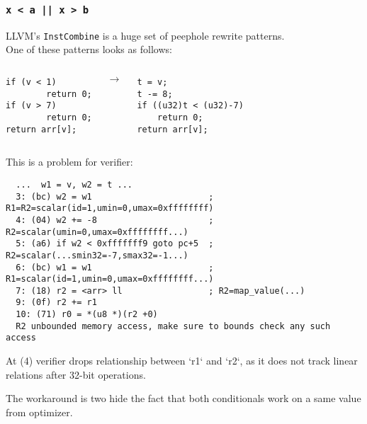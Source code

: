 \documentclass{beamer}
\newcommand{\code}[1]{\texttt{#1}}
\begin{document}
\begin{frame}
  \frametitle{\code{x < a || x > b}}

  LLVM's \code{InstCombine} is a huge set of peephole rewrite patterns. \\
  One of these patterns looks as follows:

  \vspace{0.5cm}

  \begin{columns}
    \begin{minipage}{\textwidth}
      \begin{verbatim}
if (v < 1)
        return 0;
if (v > 7)
        return 0;
return arr[v];
      \end{verbatim}
    \end{minipage}
    $\rightarrow$
    \begin{minipage}{\textwidth}
      \begin{verbatim}
t = v;
t -= 8;
if ((u32)t < (u32)-7)
	return 0;
return arr[v];
      \end{verbatim}
    \end{minipage}
  \end{columns}

  \framebreak

  This is a problem for verifier:

  \begin{verbatim}
  ...  w1 = v, w2 = t ...
  3: (bc) w2 = w1                       ; R1=R2=scalar(id=1,umin=0,umax=0xffffffff)
  4: (04) w2 += -8                      ; R2=scalar(umin=0,umax=0xffffffff...)
  5: (a6) if w2 < 0xfffffff9 goto pc+5  ; R2=scalar(...smin32=-7,smax32=-1...)
  6: (bc) w1 = w1                       ; R1=scalar(id=1,umin=0,umax=0xffffffff...)
  7: (18) r2 = <arr> ll                 ; R2=map_value(...)
  9: (0f) r2 += r1
  10: (71) r0 = *(u8 *)(r2 +0)
  R2 unbounded memory access, make sure to bounds check any such access
  \end{verbatim}


At (4) verifier drops relationship between `r1` and `r2`, as it does
not track linear relations after 32-bit operations.

  \framebreak

The workaround is two hide the fact that both conditionals work on a
same value from optimizer.


\end{frame}
\end{document}
